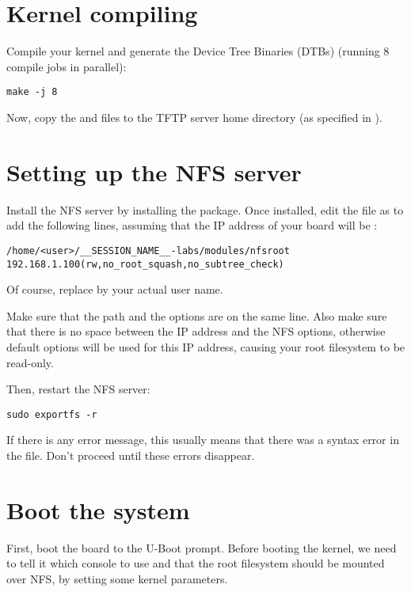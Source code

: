 \section{Kernel compiling}

Compile your kernel and generate the Device Tree Binaries (DTBs)
(running 8 compile jobs in parallel):

\begin{verbatim}
make -j 8
\end{verbatim}

Now, copy the  and  files to the
TFTP server home directory (as specified in ).

\section{Setting up the NFS server}

Install the NFS server by installing the 
package. Once installed, edit the  file as
 to add the following lines, assuming that the IP address
of your board will be :

\scriptsize
\begin{verbatim}
/home/<user>/__SESSION_NAME__-labs/modules/nfsroot 192.168.1.100(rw,no_root_squash,no_subtree_check)
\end{verbatim}
\normalsize

Of course, replace  by your actual user name.

Make sure that the path and the options are on the same line.
Also make sure that there is no space between the IP address and the NFS
options, otherwise default options will be used for this IP address,
causing your root filesystem to be read-only.

Then, restart the NFS server:

\begin{verbatim}
sudo exportfs -r
\end{verbatim}

If there is any error message, this usually means that there was a
syntax error in the  file. Don't proceed until these
errors disappear.

\section{Boot the system}

First, boot the board to the U-Boot prompt. Before booting the kernel,
we need to tell it which console to use and that the root filesystem
should be mounted over NFS, by setting some kernel parameters.

